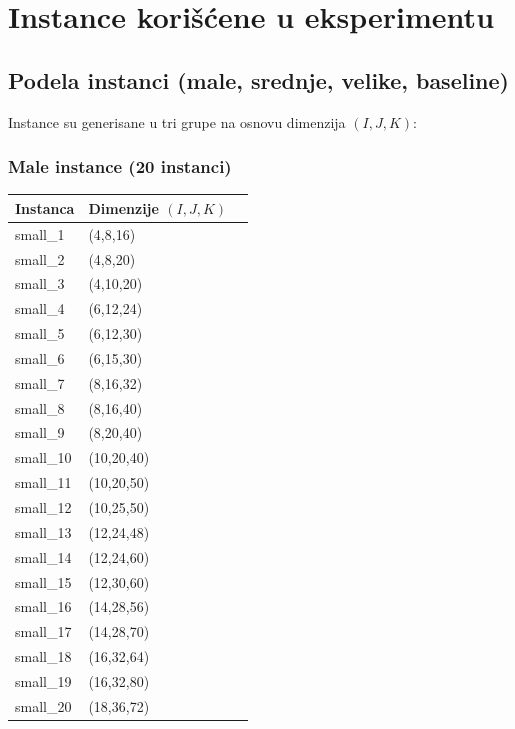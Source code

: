 \documentclass[12pt,a4paper]{article}
\begin{document}
\section{Instance korišćene u eksperimentu}

\subsection{Podela instanci (male, srednje, velike, baseline)}
Instance su generisane u tri grupe na osnovu dimenzija $(I,J,K)$:

\subsubsection*{Male instance (20 instanci)}
\begin{center}
\begin{tabular}{lll}
\toprule
\textbf{Instanca} & \textbf{Dimenzije} $(I,J,K)$ \\
\midrule
small\_1  & (4,8,16) \\
small\_2  & (4,8,20) \\
small\_3  & (4,10,20) \\
small\_4  & (6,12,24) \\
small\_5  & (6,12,30) \\
small\_6  & (6,15,30) \\
small\_7  & (8,16,32) \\
small\_8  & (8,16,40) \\
small\_9  & (8,20,40) \\
small\_10 & (10,20,40) \\
small\_11 & (10,20,50) \\
small\_12 & (10,25,50) \\
small\_13 & (12,24,48) \\
small\_14 & (12,24,60) \\
small\_15 & (12,30,60) \\
small\_16 & (14,28,56) \\
small\_17 & (14,28,70) \\
small\_18 & (16,32,64) \\
small\_19 & (16,32,80) \\
small\_20 & (18,36,72) \\
\bottomrule
\end{tabular}
\end{center}
\end{document}
